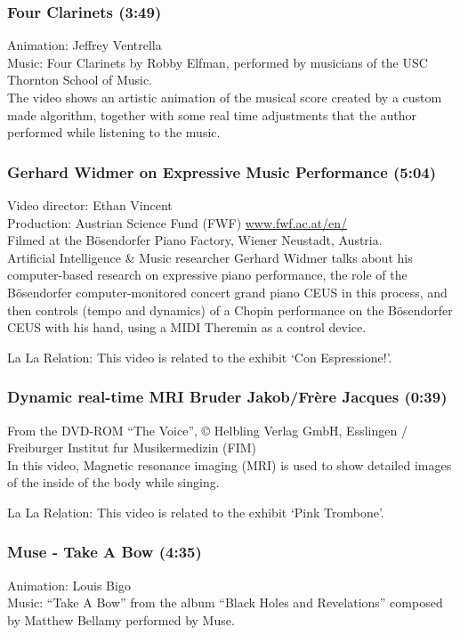 \subsubsection*{Four Clarinets (3:49)}
Animation: Jeffrey Ventrella \\
Music: Four Clarinets by Robby Elfman, performed by musicians of the USC Thornton School of Music. \\

The video shows an artistic animation of the musical score created by a custom made algorithm, together with some real time adjustments that the author performed while listening to the music.

\subsubsection*{Gerhard Widmer on Expressive Music Performance (5:04)}
Video director: Ethan Vincent \\
Production: Austrian Science Fund (FWF) \url{www.fwf.ac.at/en/} \\
Filmed at the Bösendorfer Piano Factory, Wiener Neustadt, Austria. \\

Artificial Intelligence \& Music researcher Gerhard Widmer talks about his com\-pu\-ter-based research on expressive piano performance, the role of the Bösendorfer com\-pu\-ter-mo\-ni\-to\-red concert grand piano CEUS in this process, and then controls (tempo and dynamics) of a Chopin performance on the Bösendorfer CEUS with his hand, using a MIDI Theremin as a control device.

La La Relation: This video is related to the exhibit `Con Espressione!'.

\subsubsection*{Dynamic real-time MRI Bruder Jakob/Frère Jacques (0:39)}
From the DVD-ROM ``The Voice'', © Helbling Verlag GmbH, Esslingen / Freiburger Institut fur Musikermedizin (FIM)\\

In this video, Magnetic resonance imaging (MRI) is used to show detailed images of the inside of the body while singing.

La La Relation: This video is related to the exhibit `Pink Trombone'.

\subsubsection*{Muse - Take A Bow (4:35)}
Animation: Louis Bigo \\
Music: ``Take A Bow'' from the album ``Black Holes and Revelations'' composed by Matthew Bellamy performed by Muse. \\

